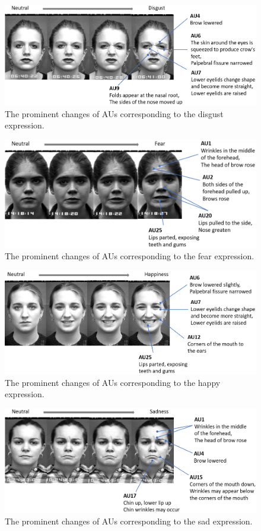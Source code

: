 \documentclass[10pt, conference, compsocconf]{IEEEtran}
\begin{document}
\begin{figure}[h]
	\centering
	\includegraphics[width=\linewidth]{AUexpression/disgust}
	\caption{The prominent changes of AUs corresponding to the disgust expression.}
\end{figure}
\begin{figure}[h]
	\centering
	\includegraphics[width=\linewidth]{AUexpression/fear}
	\caption{The prominent changes of AUs corresponding to the fear expression.}
\end{figure}
\begin{figure}[h]
	\centering
	\includegraphics[width=\linewidth]{AUexpression/happiness}
	\caption{The prominent changes of AUs corresponding to the happy expression.}
\end{figure}
\begin{figure}[h]
	\centering
	\includegraphics[width=\linewidth]{AUexpression/sadness}
	\caption{The prominent changes of AUs corresponding to the sad expression.}
\end{figure}
\end{document}
